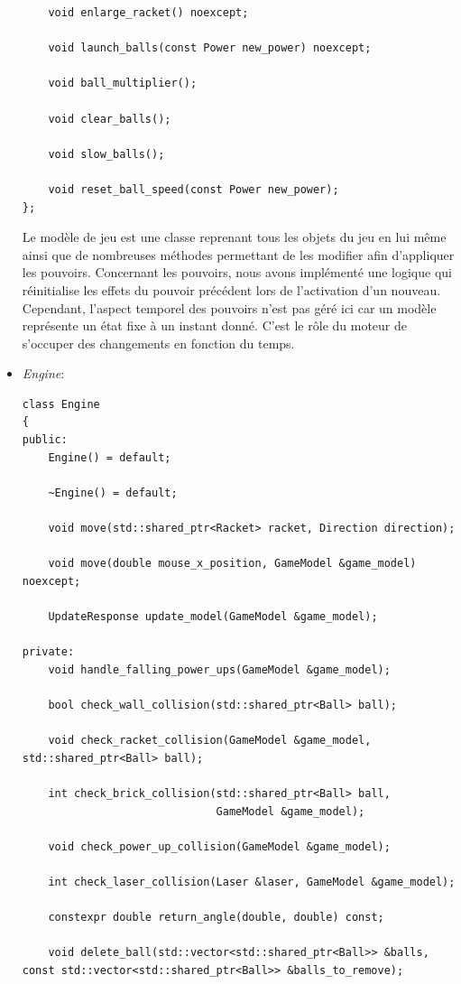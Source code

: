 \documentclass[utf8]{article}
\begin{document}
\begin{itemize}
\begin{verbatim}
    void enlarge_racket() noexcept;

    void launch_balls(const Power new_power) noexcept;

    void ball_multiplier();

    void clear_balls();

    void slow_balls();

    void reset_ball_speed(const Power new_power);
};
    \end{verbatim}
    Le modèle de jeu est une classe reprenant tous les objets du jeu en lui même ainsi que de nombreuses méthodes permettant de les modifier afin d'appliquer les pouvoirs. Concernant les pouvoirs, nous avons implémenté une logique qui réinitialise les effets du pouvoir précédent lors de l'activation d'un nouveau. Cependant, l'aspect temporel des pouvoirs n'est pas géré ici car un modèle représente un état fixe à un instant donné. C'est le rôle du moteur de s'occuper des changements en fonction du temps. \\

    \item \emph{Engine}:
    \begin{verbatim}
class Engine
{
public:
    Engine() = default;

    ~Engine() = default;

    void move(std::shared_ptr<Racket> racket, Direction direction);

    void move(double mouse_x_position, GameModel &game_model) noexcept;

    UpdateResponse update_model(GameModel &game_model);

private:
    void handle_falling_power_ups(GameModel &game_model);

    bool check_wall_collision(std::shared_ptr<Ball> ball);

    void check_racket_collision(GameModel &game_model, std::shared_ptr<Ball> ball);

    int check_brick_collision(std::shared_ptr<Ball> ball,
                              GameModel &game_model);

    void check_power_up_collision(GameModel &game_model);

    int check_laser_collision(Laser &laser, GameModel &game_model);

    constexpr double return_angle(double, double) const;

    void delete_ball(std::vector<std::shared_ptr<Ball>> &balls, const std::vector<std::shared_ptr<Ball>> &balls_to_remove);


\end{verbatim}
\end{itemize}
\end{document}
